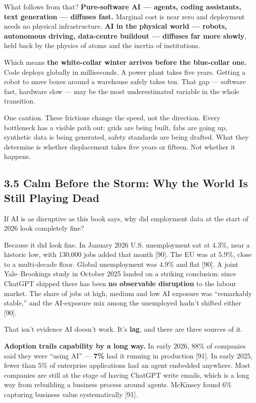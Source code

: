 \documentclass[11pt,a4paper]{article}
\begin{document}
What follows from that? \textbf{Pure-software AI --- agents, coding assistants, text generation --- diffuses fast.} Marginal cost is near zero and deployment needs no physical infrastructure. \textbf{AI in the physical world --- robots, autonomous driving, data-centre buildout --- diffuses far more slowly}, held back by the physics of atoms and the inertia of institutions.

Which means \textbf{the white-collar winter arrives before the blue-collar one.} Code deploys globally in milliseconds. A power plant takes five years. Getting a robot to move boxes around a warehouse safely takes ten. That gap --- software fast, hardware slow --- may be the most underestimated variable in the whole transition.

One caution. These frictions change the speed, not the direction. Every bottleneck has a visible path out: grids are being built, fabs are going up, synthetic data is being generated, safety standards are being drafted. What they determine is whether displacement takes five years or fifteen. Not whether it happens.

\subsection{3.5 Calm Before the Storm: Why the World Is Still Playing Dead}

If AI is as disruptive as this book says, why did employment data at the start of 2026 look completely fine?

Because it did look fine. In January 2026 U.S. unemployment sat at 4.3\%, near a historic low, with 130,000 jobs added that month [90]. The EU was at 5.9\%, close to a multi-decade floor. Global unemployment was 4.9\% and flat [90]. A joint Yale--Brookings study in October 2025 landed on a striking conclusion: since ChatGPT shipped there has been \textbf{no observable disruption} to the labour market. The share of jobs at high, medium and low AI exposure was ``remarkably stable,'' and the AI-exposure mix among the unemployed hadn't shifted either [90].

That isn't evidence AI doesn't work. It's \textbf{lag}, and there are three sources of it.

\textbf{Adoption trails capability by a long way.} In early 2026, 88\% of companies said they were ``using AI'' --- \textbf{7\%} had it running in production [91]. In early 2025, fewer than 5\% of enterprise applications had an agent embedded anywhere. Most companies are still at the stage of having ChatGPT write emails, which is a long way from rebuilding a business process around agents. McKinsey found 6\% capturing business value systematically [91].
\end{document}
